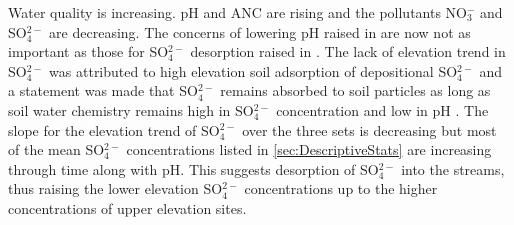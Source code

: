 Water quality is increasing.  
pH and ANC are rising and the pollutants NO$_3^-$ and SO$_4^{2-}$ are decreasing.  
The concerns of lowering pH raised in \citet{robinson2008ph} are now not as important as those for SO$_4^{2-}$ desorption raised in \citet{cai2013}.  
The lack of elevation trend in SO$_4^{2-}$ was attributed to high elevation soil adsorption of depositional SO$_4^{2-}$ and a statement was made that SO$_4^{2-}$ remains absorbed to soil particles as long as soil water chemistry remains high in SO$_4^{2-}$ concentration and low in pH \citep{cai2011long}.  
The slope for the elevation trend of SO$_4^{2-}$ over the three sets is decreasing but most of the mean SO$_4^{2-}$ concentrations listed in \autoref{sec:DescriptiveStats} are increasing through time along with pH.
This suggests desorption of SO$_4^{2-}$ into the streams, thus raising the lower elevation SO$_4^{2-}$ concentrations up to the higher concentrations of upper elevation sites.


  
